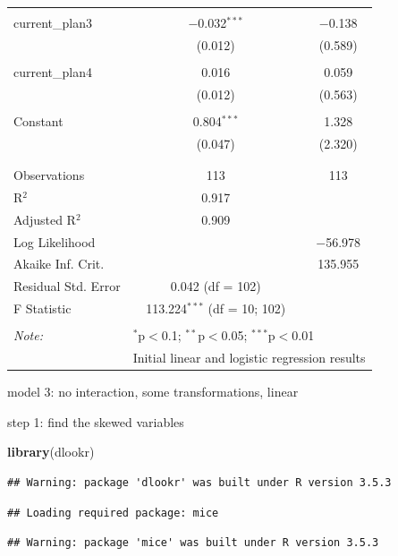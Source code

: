 \documentclass[
]{article}
\newenvironment{Shaded}{\begin{snugshade}}{\end{snugshade}}
\newcommand{\KeywordTok}[1]{\textcolor[rgb]{0.13,0.29,0.53}{\textbf{#1}}}
\newcommand{\NormalTok}[1]{#1}
\begin{document}
\begin{table}[!htbp]
\begin{tabular}{@{\extracolsep{5pt}}lcc}
  & & \\ 
 current\_plan3 & $-$0.032$^{***}$ & $-$0.138 \\ 
  & (0.012) & (0.589) \\ 
  & & \\ 
 current\_plan4 & 0.016 & 0.059 \\ 
  & (0.012) & (0.563) \\ 
  & & \\ 
 Constant & 0.804$^{***}$ & 1.328 \\ 
  & (0.047) & (2.320) \\ 
  & & \\ 
\hline \\[-1.8ex] 
Observations & 113 & 113 \\ 
R$^{2}$ & 0.917 &  \\ 
Adjusted R$^{2}$ & 0.909 &  \\ 
Log Likelihood &  & $-$56.978 \\ 
Akaike Inf. Crit. &  & 135.955 \\ 
Residual Std. Error & 0.042 (df = 102) &  \\ 
F Statistic & 113.224$^{***}$ (df = 10; 102) &  \\ 
\hline 
\hline \\[-1.8ex] 
\textit{Note:}  & \multicolumn{2}{l}{$^{*}$p$<$0.1; $^{**}$p$<$0.05; $^{***}$p$<$0.01} \\ 
 & \multicolumn{2}{l}{Initial linear and logistic regression results} \\ 
\end{tabular} 
\end{table}

model 3: no interaction, some transformations, linear

step 1: find the skewed variables

\begin{Shaded}
\begin{Highlighting}[]
\KeywordTok{library}\NormalTok{(dlookr)}
\end{Highlighting}
\end{Shaded}

\begin{verbatim}
## Warning: package 'dlookr' was built under R version 3.5.3
\end{verbatim}

\begin{verbatim}
## Loading required package: mice
\end{verbatim}

\begin{verbatim}
## Warning: package 'mice' was built under R version 3.5.3
\end{verbatim}
\end{document}
